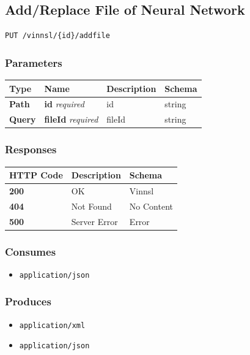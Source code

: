 \subsection{Add/Replace File of Neural
Network}\label{addreplace-file-of-neural-network}

\begin{verbatim}
PUT /vinnsl/{id}/addfile
\end{verbatim}

\subsubsection{Parameters}\label{parameters-4}

\begin{longtable}[]{@{}llll@{}}
\toprule
Type & Name & Description & Schema\tabularnewline
\midrule
\endhead
\textbf{Path} & \textbf{id} \emph{required} & id & string\tabularnewline
\textbf{Query} & \textbf{fileId} \emph{required} & fileId &
string\tabularnewline
\bottomrule
\end{longtable}

\subsubsection{Responses}\label{responses-5}

\begin{longtable}[]{@{}lll@{}}
\toprule
HTTP Code & Description & Schema\tabularnewline
\midrule
\endhead
\textbf{200} & OK & Vinnsl\tabularnewline
\textbf{404} & Not Found & No Content\tabularnewline
\textbf{500} & Server Error & Error\tabularnewline
\bottomrule
\end{longtable}

\subsubsection{Consumes}\label{consumes-1}

\begin{itemize}
\tightlist
\item
  \texttt{application/json}
\end{itemize}

\subsubsection{Produces}\label{produces-5}

\begin{itemize}
\tightlist
\item
  \texttt{application/xml}
\item
  \texttt{application/json}
\end{itemize}

